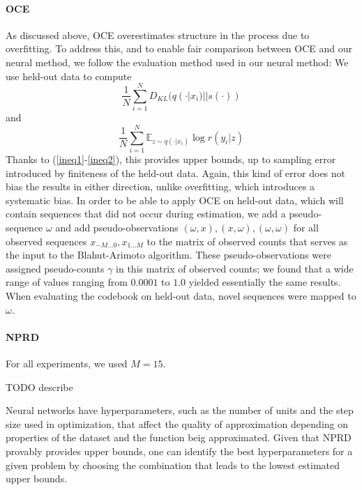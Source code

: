 \documentclass[11pt,letterpaper]{article}
\newcommand{\E}[0]{\mathbb{E}}
\begin{document}
\paragraph{OCE}
As discussed above, OCE overestimates structure in the process due to overfitting.
To address this, and to enable fair comparison between OCE and our neural method, we follow the evaluation method used in our neural method:
We use held-out data to compute
$$\frac{1}{N} \sum_{i=1}^N D_{KL}(q(\cdot|x_i) || s(\cdot))$$ %
and
$$\frac{1}{N} \sum_{i=1}^N \E_{z \sim q(\cdot|x_i)} \log r(y_i|z)$$
Thanks to (\ref{ineq1}-\ref{ineq2}), this provides upper bounds, up to sampling error introduced by finiteness of the held-out data.
Again, this kind of error does not bias the results in either direction, unlike overfitting, which introduces a systematic bias.
In order to be able to apply OCE on held-out data, which will contain sequences that did not occur during estimation, we add a pseudo-sequence $\omega$ and add pseudo-observations $(\omega, x), (x, \omega), (\omega, \omega)$ for all observed sequences $x_{-M...0}, x_{1...M}$ to the matrix of observed counts that serves as the input to the Blahut-Arimoto algorithm.
These pseudo-observations were assigned pseudo-counts $\gamma$ in this matrix of observed counts; we found that a wide range of values ranging from $0.0001$ to $1.0$ yielded essentially the same results.
When evaluating the codebook on held-out data, novel sequences were mapped to $\omega$.




\paragraph{NPRD}
For all experiments, we used $M=15$.


TODO describe

Neural networks have hyperparameters, such as the number of units and the step size used in optimization, that affect the quality of approximation depending on properties of the dataset and the function beig approximated.
Given that NPRD provably provides upper bounds, one can identify the best hyperparameters for a given problem by choosing the combination that leads to the lowest estimated upper bounds.
\end{document}
